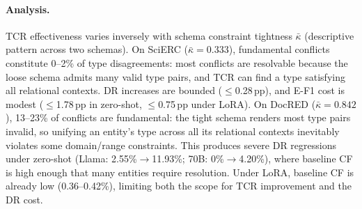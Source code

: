 \begin{table}[h]
\centering
\small
{}
\caption{TCR on DocRED ($\bar{\kappa}{=}0.842$, 998 docs).
Under zero-shot, TCR introduces substantial DR regressions (up to $+$9.38\,pp for Llama) and E-F1 drops (up to $-$5.98\,pp for 70B).
Fundamental conflict rates are 12--23\%, an order of magnitude higher than SciERC.
Under LoRA, low baseline CF (0.36--0.42\%) limits both TCR impact and DR cost.}
\label{tab:tcr-docred}
\end{table}

\paragraph{Analysis.}
TCR effectiveness varies inversely with schema constraint tightness $\bar{\kappa}$ (descriptive pattern across two schemas).
On SciERC ($\bar{\kappa}{=}0.333$), fundamental conflicts constitute 0--2\% of type disagreements: most conflicts are resolvable because the loose schema admits many valid type pairs, and TCR can find a type satisfying all relational contexts.
DR increases are bounded ($\leq$0.28\,pp), and E-F1 cost is modest ($\leq$1.78\,pp in zero-shot, $\leq$0.75\,pp under LoRA).
On DocRED ($\bar{\kappa}{=}0.842$), 13--23\% of conflicts are fundamental: the tight schema renders most type pairs invalid, so unifying an entity's type across all its relational contexts inevitably violates some domain/range constraints.
This produces severe DR regressions under zero-shot (Llama: 2.55\%$\to$11.93\%; 70B: 0\%$\to$4.20\%), where baseline CF is high enough that many entities require resolution.
Under LoRA, baseline CF is already low (0.36--0.42\%), limiting both the scope for TCR improvement and the DR cost.

